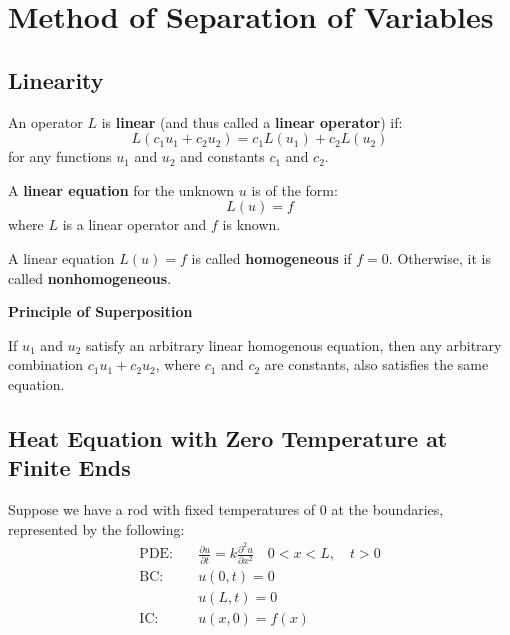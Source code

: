 \documentclass{article}
\begin{document}
\section{Method of Separation of Variables}
 
\subsection{Linearity}
\begin{definition}
    An operator \(L\) is \textbf{linear} (and thus called a \textbf{linear operator}) if:
    \[
        L(c_1u_1+c_2u_2)=c_1L(u_1)+c_2L(u_2)
    \]
    for any functions \(u_1\) and \(u_2\) and constants \(c_1\) and \(c_2\).    
\end{definition}

\begin{definition}
    A \textbf{linear equation} for the unknown \(u\) is of the form:
    \[
        L(u)=f
    \]
    where \(L\) is a linear operator and \(f\) is known.
\end{definition}

\begin{definition}
    A linear equation \(L(u)=f\) is called \textbf{homogeneous} if \(f=0\). Otherwise, it is called \textbf{nonhomogeneous}.
\end{definition}

\begin{theorem}{\textbf{Principle of Superposition}}
    $ $
    
    If \(u_1\) and \(u_2\) satisfy an arbitrary linear homogenous equation, then any arbitrary combination \(c_1u_1+c_2u_2\), where \(c_1\) and \(c_2\) are constants, also 
    satisfies the same equation.     
\end{theorem}

\subsection{Heat Equation with Zero Temperature at Finite Ends}

Suppose we have a rod with fixed temperatures of \(0\) at the boundaries, represented by the following:
\[
    \begin{aligned}
        \text{PDE:} \quad & \frac{\partial u}{\partial t}=k\frac{\partial ^2 u}{\partial x^2} \quad 0<x<L, \quad t> 0 \\
        \text{BC:} \quad & u(0,t)=0 \\
        & u(L,t) = 0 \\
        \text{IC:} \quad & u(x,0)=f(x)
    \end{aligned}
\]
\end{document}
